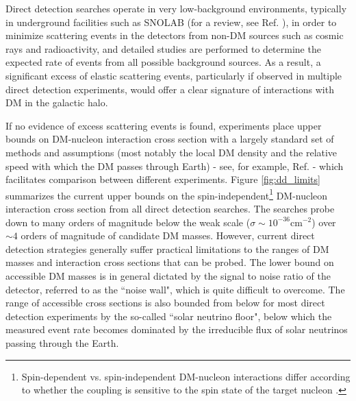 Direct detection searches operate in very low-background environments, typically in underground facilities such as SNOLAB (for a review, see Ref. \cite{Lawson_2013}), in order to minimize scattering events in the detectors from non-DM sources such as cosmic rays and radioactivity, and detailed studies are performed to determine the expected rate of events from all possible background sources. As a result, a significant excess of elastic scattering events, particularly if observed in multiple direct detection experiments, would offer a clear signature of interactions with DM in the galactic halo. 

If no evidence of excess scattering events is found, experiments place upper bounds on DM-nucleon interaction cross section with a largely standard set of methods and assumptions (most notably the local DM density and the relative speed with which the DM passes through Earth) - see, for example, Ref. \cite{dd_results_standards_2021} - which facilitates comparison between different experiments. Figure \ref{fig:dd_limits} summarizes the current upper bounds on the spin-independent\footnote{Spin-dependent vs. spin-independent DM-nucleon interactions differ according to whether the coupling is sensitive to the spin state of the target nucleon \cite{billard2021direct}.} DM-nucleon interaction cross section from all direct detection searches. The searches probe down to many orders of magnitude below the weak scale (\(\sigma\sim10^{-36}\)cm\(^{-2}\)) over \(\sim4\) orders of magnitude of candidate DM masses. However, current direct detection strategies generally suffer practical limitations to the ranges of DM masses and interaction cross sections that can be probed. The lower bound on accessible DM masses is in general dictated by the signal to noise ratio of the detector, referred to as the ``noise wall", which is quite difficult to overcome. The range of accessible cross sections is also bounded from below for most direct detection experiments by the so-called ``solar neutrino floor", below which the measured event rate becomes dominated by the irreducible flux of solar neutrinos passing through the Earth. 

